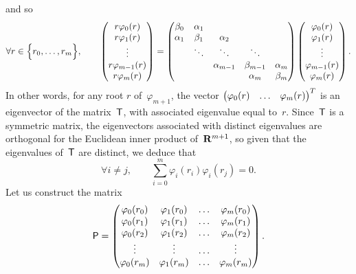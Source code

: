 and so
\[
    \forall r \in \Bigl\{ r_0, \dotsc, r_m \Bigr\}, \qquad
    \begin{pmatrix}
        r \varphi_0(r) \\
        r \varphi_1(r) \\
        \vdots \\
        r \varphi_{m-1}(r) \\
        r \varphi_m(r)
    \end{pmatrix}
    =
    \begin{pmatrix}
        \beta_0 & \alpha_1 \\
        \alpha_1 & \beta_1 & \alpha_2 \\
                 & \ddots & \ddots & \ddots \\
                 & & \alpha_{m-1} & \beta_{m-1} & \alpha_m \\
                 & & & \alpha_m & \beta_m
    \end{pmatrix}
    \begin{pmatrix}
        \varphi_0(r) \\
        \varphi_1(r) \\
        \vdots \\
        \varphi_{m-1}(r) \\
        \varphi_m(r)
    \end{pmatrix}.
\]
In other words,
for any root $r$ of~$\varphi_{m+1}$,
the vector $\begin{pmatrix} \varphi_0(r) & \hdots & \varphi_m(r) \end{pmatrix}^T$
is an eigenvector of the matrix~$\mathsf T$,
with associated eigenvalue equal to~$r$.
Since~$\mathsf T$ is a symmetric matrix,
the eigenvectors associated with distinct eigenvalues are orthogonal for the Euclidean inner product of~$\mathbf R^{m+1}$,
so given that the eigenvalues of~$\mathsf T$ are distinct,
we deduce that
\begin{equation}
    \label{eq:orthogonality}
    \forall i \neq j, \qquad
    \sum_{i=0}^{m} \varphi_i(r_i) \varphi_i(r_j) = 0.
\end{equation}
Let us construct the matrix
\[
    \mathsf P =
    \begin{pmatrix}
        \varphi_0(r_0) & \varphi_1(r_0) & \hdots & \varphi_m(r_0) \\
        \varphi_0(r_1) & \varphi_1(r_1) & \hdots & \varphi_m(r_1) \\
        \varphi_0(r_2) & \varphi_1(r_2) & \hdots & \varphi_m(r_2) \\
        \vdots & \vdots & \hdots & \vdots \\
        \varphi_0(r_m) & \varphi_1(r_m) & \hdots & \varphi_m(r_m)
    \end{pmatrix}.
\]
